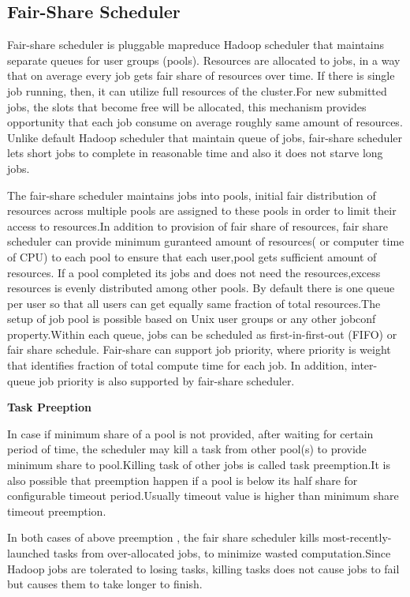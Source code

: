 \subsection{Fair-Share Scheduler}

Fair-share scheduler is pluggable mapreduce Hadoop scheduler that maintains separate queues for user groups (pools). Resources are allocated to jobs, in a way that on average every job gets fair share of resources over time. If there is single job running, then, it can utilize full resources of the cluster.For new submitted jobs, the slots that become free will be allocated, this mechanism provides opportunity that each job consume on average roughly same amount of resources. Unlike default Hadoop scheduler that maintain queue of jobs, fair-share scheduler lets short jobs to complete in reasonable time and also it does not starve long jobs.  \cite{dynamic} \cite{fair}

 
The fair-share scheduler maintains jobs into pools, initial fair distribution of resources across multiple pools are assigned to these pools in order to limit their access to resources.In addition to provision of fair share of resources, fair share scheduler can provide minimum guranteed amount of resources( or computer time of CPU) to each pool to ensure that each user,pool gets sufficient amount of resources. If a pool completed its jobs and does not need the resources,excess resources is evenly distributed among other pools.\cite{fair}
 By default there is one queue per user so that all users can get equally same fraction of total resources.The setup of job pool is possible based on Unix user groups or any other jobconf property.Within each queue, jobs can be scheduled as first-in-first-out (FIFO) or fair share schedule. Fair-share can support job priority, where priority is weight that identifies fraction of total compute time for each job. In addition,  inter-queue job priority is also supported by fair-share scheduler.\cite{fair}
 
 
 \textbf{Task Preeption}
 
 In case if minimum share of a pool is not provided, after waiting for certain period of time, the scheduler may kill a task from other pool(s) to provide minimum share to pool.Killing task of other jobs is called task preemption.It is also possible that preemption happen if a pool is below its half share for configurable timeout period.Usually timeout value is higher than minimum share timeout preemption.\cite{fair} \cite{fairw} 
 
In both cases of above preemption , the fair share scheduler kills most-recently-launched tasks from over-allocated jobs, to minimize wasted computation.Since Hadoop jobs are tolerated to losing tasks, killing tasks does not cause jobs to fail but causes them to take longer to finish.\cite{fair}\cite{fairw} 
 














